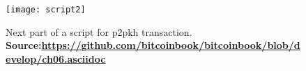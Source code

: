 \begin{figure}[!htbp]
    \centering
    \texttt{[image: script2]}
    \caption[Next part of a script for \gls{p2pkh} transaction]
    {Next part of a script for \gls{p2pkh} transaction. \\ \textbf{Source:\url{https://github.com/bitcoinbook/bitcoinbook/blob/develop/ch06.asciidoc}}}
    \label{fig:script2}
\end{figure}
    